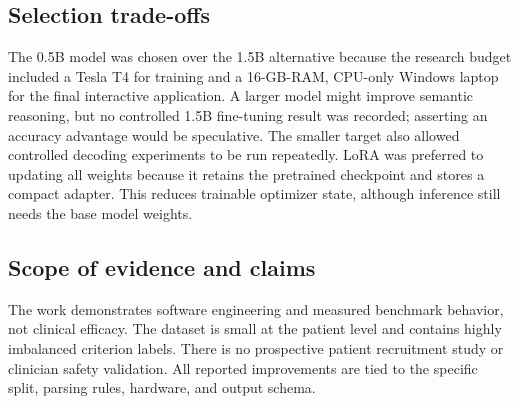 \documentclass[conference]{IEEEtran}
\begin{document}
\subsection{Selection trade-offs}
The 0.5B model was chosen over the 1.5B alternative because the research budget included a Tesla T4 for training and a 16-GB-RAM, CPU-only Windows laptop for the final interactive application. A larger model might improve semantic reasoning, but no controlled 1.5B fine-tuning result was recorded; asserting an accuracy advantage would be speculative. The smaller target also allowed controlled decoding experiments to be run repeatedly. LoRA was preferred to updating all weights because it retains the pretrained checkpoint and stores a compact adapter. This reduces trainable optimizer state, although inference still needs the base model weights.

\subsection{Scope of evidence and claims}
The work demonstrates software engineering and measured benchmark behavior, not clinical efficacy. The dataset is small at the patient level and contains highly imbalanced criterion labels. There is no prospective patient recruitment study or clinician safety validation. All reported improvements are tied to the specific split, parsing rules, hardware, and output schema.
\end{document}
